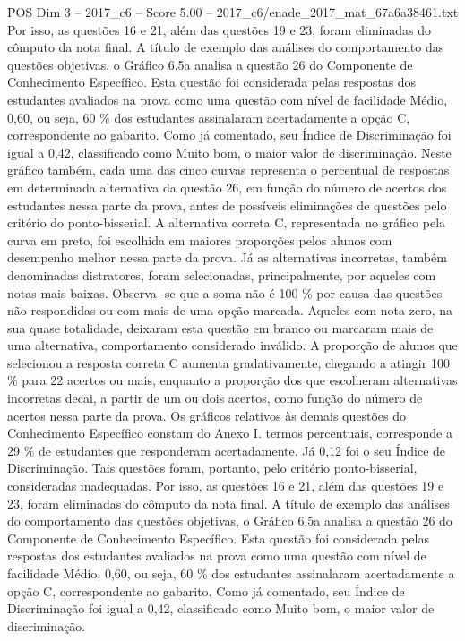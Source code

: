 \begin{textsample}{POS Dim 3 – 2017\_c6 – Score 5.00 – 2017\_c6/enade\_2017\_mat\_67a6a38461.txt}
Por isso, as questões 16 e 21, além das questões 19 e 23, foram eliminadas do cômputo da nota final.
A título de exemplo das análises do comportamento das questões objetivas, o Gráfico 6.5a analisa a questão 26 do Componente de Conhecimento Específico.
Esta questão foi considerada pelas respostas dos estudantes avaliados na prova como uma questão com nível de facilidade Médio, 0,60, ou seja, 60 \% dos estudantes assinalaram acertadamente a opção C, correspondente ao gabarito.
Como já comentado, seu Índice de Discriminação foi igual a 0,42, classificado como Muito bom, o maior valor de discriminação.
Neste gráfico também, cada uma das cinco curvas representa o percentual de respostas em determinada alternativa da questão 26, em função do número de acertos dos estudantes nessa parte da prova, antes de possíveis eliminações de questões pelo critério do ponto-bisserial.
A alternativa correta C, representada no gráfico pela curva em preto, foi escolhida em maiores proporções pelos alunos com desempenho melhor nessa parte da prova.
Já as alternativas incorretas, também denominadas distratores, foram selecionadas, principalmente, por aqueles com notas mais baixas.
Observa -se que a soma não é 100 \% por causa das questões não respondidas ou com mais de uma opção marcada.
Aqueles com nota zero, na sua quase totalidade, deixaram esta questão em branco ou marcaram mais de uma alternativa, comportamento considerado inválido.
A proporção de alunos que selecionou a resposta correta C aumenta gradativamente, chegando a atingir 100 \% para 22 acertos ou mais, enquanto a proporção dos que escolheram alternativas incorretas decai, a partir de um ou dois acertos, como função do número de acertos nessa parte da prova.
Os gráficos relativos às demais questões do Conhecimento Específico constam do Anexo I. termos percentuais, corresponde a 29 \% de estudantes que responderam acertadamente.
Já 0,12 foi o seu Índice de Discriminação.
Tais questões foram, portanto, pelo critério ponto-bisserial, consideradas inadequadas.
Por isso, as questões 16 e 21, além das questões 19 e 23, foram eliminadas do cômputo da nota final.
A título de exemplo das análises do comportamento das questões objetivas, o Gráfico 6.5a analisa a questão 26 do Componente de Conhecimento Específico.
Esta questão foi considerada pelas respostas dos estudantes avaliados na prova como uma questão com nível de facilidade Médio, 0,60, ou seja, 60 \% dos estudantes assinalaram acertadamente a opção C, correspondente ao gabarito.
Como já comentado, seu Índice de Discriminação foi igual a 0,42, classificado como Muito bom, o maior valor de discriminação.

\end{textsample}
